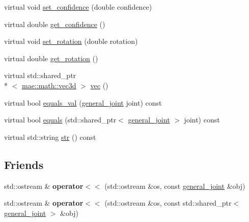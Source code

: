 \begin{DoxyCompactItemize}
virtual void \hyperlink{classmae_1_1general__joint_abec822aade279def9673ed2673dff673}{set\-\_\-confidence} (double confidence)
\item 
virtual double \hyperlink{classmae_1_1general__joint_aab49740a9add5d758a8dd37dd86bd89c}{get\-\_\-confidence} ()
\item 
virtual void \hyperlink{classmae_1_1general__joint_a3b12611df4acccee5fd2be3552905081}{set\-\_\-rotation} (double rotation)
\item 
virtual double \hyperlink{classmae_1_1general__joint_a0bcdc19080710b7284cdbab217329ecf}{get\-\_\-rotation} ()
\item 
virtual std\-::shared\-\_\-ptr\\*
$<$ \hyperlink{classmae_1_1math_1_1vec3d}{mae\-::math\-::vec3d} $>$ \hyperlink{classmae_1_1general__joint_a22e3296285348c90043d777873d34dd8}{vec} ()
\item 
virtual bool \hyperlink{classmae_1_1general__joint_a03511aad23481250ca6389ace91d9c4f}{equals\-\_\-val} (\hyperlink{classmae_1_1general__joint}{general\-\_\-joint} joint) const 
\item 
virtual bool \hyperlink{classmae_1_1general__joint_aa9e2c5875fac4e231e2a5ed77743e3d6}{equals} (std\-::shared\-\_\-ptr$<$ \hyperlink{classmae_1_1general__joint}{general\-\_\-joint} $>$ joint) const 
\item 
virtual std\-::string \hyperlink{classmae_1_1general__joint_af19565b9613d6f6f69de5503a262e4d1}{str} () const 
\end{DoxyCompactItemize}
\subsection*{Friends}
\begin{DoxyCompactItemize}
\item 
\hypertarget{classmae_1_1general__joint_a9b8d3a622cafb8ac78ce362af55036b9}{std\-::ostream \& {\bfseries operator$<$$<$} (std\-::ostream \&os, const \hyperlink{classmae_1_1general__joint}{general\-\_\-joint} \&obj)}\label{classmae_1_1general__joint_a9b8d3a622cafb8ac78ce362af55036b9}

\item 
\hypertarget{classmae_1_1general__joint_a3ce39a286aaa78b4d9d2cb7b9007be51}{std\-::ostream \& {\bfseries operator$<$$<$} (std\-::ostream \&os, const std\-::shared\-\_\-ptr$<$ \hyperlink{classmae_1_1general__joint}{general\-\_\-joint} $>$ \&obj)}\label{classmae_1_1general__joint_a3ce39a286aaa78b4d9d2cb7b9007be51}

\end{DoxyCompactItemize}


